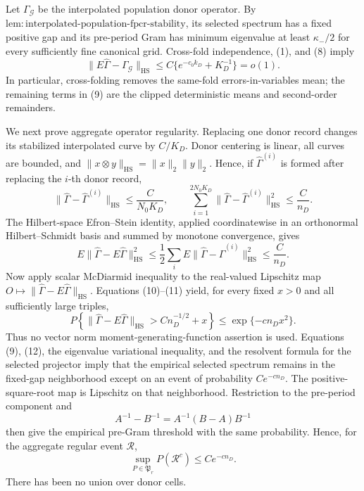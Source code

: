 Let \(\Gamma_{\mathcal G}\) be the interpolated population donor operator.
By \(\mathrm{lem:interpolated\mbox{-}population\mbox{-}fpcr\mbox{-}stability}\),
its selected spectrum has a fixed positive gap and its pre-period Gram has
minimum eigenvalue at least \(\kappa_-/2\) for every sufficiently fine
canonical grid.  Cross-fold independence, (1), and (8) imply
\[
 \|E\widehat\Gamma-\Gamma_{\mathcal G}\|_{\mathrm{HS}}
 \leq C\{e^{-c_0k_D}+K_D^{-1}\}=o(1).                    \tag{9}
\]
In particular, cross-folding removes the same-fold errors-in-variables mean;
the remaining terms in (9) are the clipped deterministic means and
second-order remainders.

We next prove aggregate operator regularity.  Replacing one donor record changes
its stabilized interpolated curve by \(C/K_D\).  Donor centering is linear, all
curves are bounded, and
\(\|x\otimes y\|_{\mathrm{HS}}=\|x\|_2\|y\|_2\).  Hence, if
\(\widehat\Gamma^{(i)}\) is formed after replacing the \(i\)-th donor record,
\[
 \|\widehat\Gamma-\widehat\Gamma^{(i)}\|_{\mathrm{HS}}
 \leq\frac{C}{N_0K_D},
 \qquad
 \sum_{i=1}^{2N_0K_D}
 \|\widehat\Gamma-\widehat\Gamma^{(i)}\|_{\mathrm{HS}}^2
 \leq\frac{C}{n_D}.                                      \tag{10}
\]
The Hilbert-space Efron--Stein identity, applied coordinatewise in an
orthonormal Hilbert--Schmidt basis and summed by monotone convergence, gives
\[
 E\|\widehat\Gamma-E\widehat\Gamma\|_{\mathrm{HS}}^2
 \leq\frac12\sum_iE
 \|\widehat\Gamma-\widehat\Gamma^{(i)}\|_{\mathrm{HS}}^2
 \leq\frac{C}{n_D}.                                      \tag{11}
\]
Now apply scalar McDiarmid inequality to the real-valued Lipschitz map
\(O\mapsto\|\widehat\Gamma-E\widehat\Gamma\|_{\mathrm{HS}}\).  Equations
(10)--(11) yield, for every fixed \(x>0\) and all sufficiently large triples,
\[
 P\left\{\|\widehat\Gamma-E\widehat\Gamma\|_{\mathrm{HS}}
 >C n_D^{-1/2}+x\right\}
 \leq \exp\{-c n_Dx^2\}.                                 \tag{12}
\]
Thus no vector norm moment-generating-function assertion is used.  Equations
(9), (12), the eigenvalue variational inequality, and the resolvent formula for
the selected projector imply that the empirical selected spectrum remains in
the fixed-gap neighborhood except on an event of probability \(Ce^{-cn_D}\).
The positive-square-root map is Lipschitz on that neighborhood.  Restriction to
the pre-period component and
\[
 A^{-1}-B^{-1}=A^{-1}(B-A)B^{-1}                           \tag{13}
\]
then give the empirical pre-Gram threshold with the same probability.  Hence,
for the aggregate regular event \(\mathcal R\),
\[
 \sup_{P\in\mathfrak P_r}P(\mathcal R^c)\leq Ce^{-cn_D}. \tag{14}
\]
There has been no union over donor cells.

